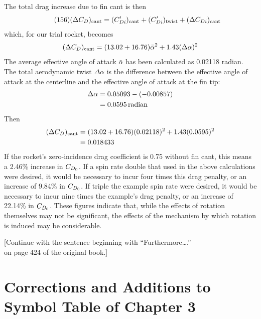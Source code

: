 The total drag increase due to fin cant is then
\begin{equation*}\tag{156}
(\Delta C_{D})_{\mathrm{cant}} = (C_{Di}')_{\mathrm{cant}} + (C_{Di}')_{\mathrm{twist}}
+ (\Delta C_{Di})_{\mathrm{cant}}
\end{equation*}
which, for our trial rocket, becomes
\begin{equation*}
(\Delta C_{D})_{\mathrm{cant}} = (13.02 + 16.76)\bar{\alpha}^{2} + 1.43(\Delta\alpha)^{2}
\end{equation*}
The average effective angle of attack $\bar{\alpha}$ has been calculated as 0.02118 radian. The
total aerodynamic twist $\Delta\alpha$ is the difference between the effective angle of attack at
the centerline and the effective angle of attack at the fin tip:
\begin{align*}
\Delta\alpha &= 0.05093 - (-0.00857)\\
&= 0.0595\,\mathrm{radian}
\end{align*}
Then
\begin{align*}
(\Delta C_{D})_{\mathrm{cant}} &= (13.02 + 16.76)(0.02118)^{2} + 1.43(0.0595)^{2}\\
&= 0.018433
\end{align*}
If the rocket's zero-incidence drag coefficient is 0.75 without fin cant, this means a 2.46\%
increase in $C_{D_0}$. If a spin rate double that used in the above calculations were desired, it
would be necessary to incur four times this drag penalty, or an increase of 9.84\% in $C_{D_0}$. If
triple the example spin rate were desired, it would be necessary to incur nine times the example's
drag penalty, or an increase of 22.14\% in $C_{D_0}$. These figures indicate that, while the effects
of rotation themselves may not be significant, the effects of the mechanism by which rotation is
induced may be considerable.

\begin{center}
[Continue with the sentence beginning with ``Furthermore\ldots.''\\
on page 424 of the original book.]
\end{center}

\noindent{}

\chapter{Corrections and Additions to Symbol Table of Chapter 3}\label{supp:ch3-symbols}

